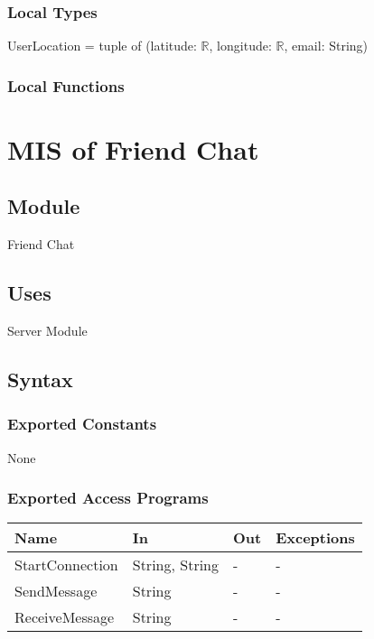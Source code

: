 \documentclass[12pt, titlepage]{article}
\begin{document}
\subsubsection{Local Types}

UserLocation = tuple of (latitude: $\mathbb{R}$, longitude: $\mathbb{R}$, email: String)

\subsubsection{Local Functions}

\newpage

\section{MIS of Friend Chat} \label{mFC}

\subsection{Module}

Friend Chat

\subsection{Uses}

Server Module

\subsection{Syntax}

\subsubsection{Exported Constants}

None

\subsubsection{Exported Access Programs}

\begin{center}
\begin{tabular}{p{4cm} p{3cm} p{3cm} p{4cm}}
\hline
\textbf{Name} & \textbf{In} & \textbf{Out} & \textbf{Exceptions} \\
\hline
StartConnection & String, String & - & - \\
SendMessage & String & - & - \\
ReceiveMessage & String & - & - \\

\hline
\end{tabular}
\end{center}
\end{document}
